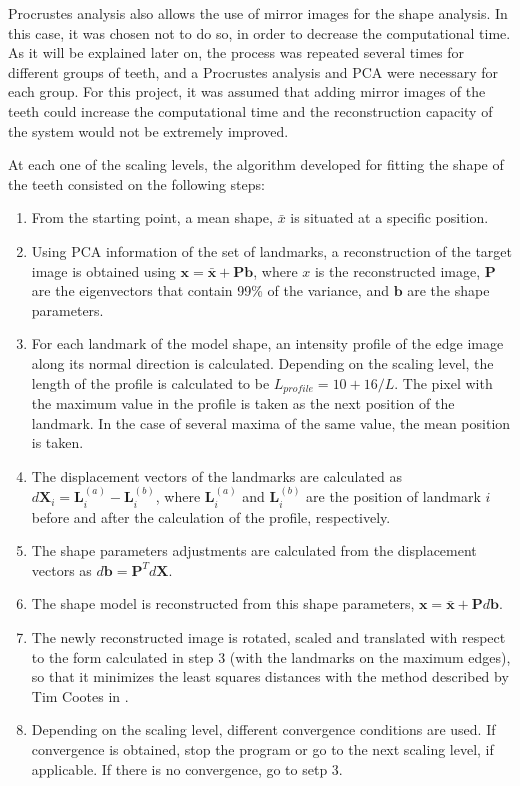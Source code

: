 \documentclass[a4paper,11pt,twoside]{article}
\begin{document}
Procrustes analysis also allows the use of mirror images for the shape analysis. In this case, it was chosen not to do so, in order to decrease the computational time. As it will be explained later on, the process was repeated several times for different groups of teeth, and a Procrustes analysis and PCA were necessary for each group. For this project, it was assumed that adding mirror images of the teeth could increase the computational time and the reconstruction capacity of the system would not be extremely improved.

At each one of the scaling levels, the algorithm developed for fitting the shape of the teeth consisted on the following steps:

\begin{enumerate}

\item From the starting point, a mean shape, $\bar{x}$ is situated at a specific position.

\item Using PCA information of the set of landmarks, a reconstruction of the target image is obtained using $\mathbf{x} = \bar{\mathbf{x}} + \mathbf{Pb}$, where $x$ is the reconstructed image, $\mathbf{P}$ are the eigenvectors that contain 99\% of the variance, and $\mathbf{b}$ are the shape parameters.

\item For each landmark of the model shape, an intensity profile of the edge image along its normal direction is calculated. Depending on the scaling level, the length of the profile is calculated to be $L_{profile} = 10 + 16/L$. The pixel with the maximum value in the profile is taken as the next position of the landmark. In the case of several maxima of the same value, the mean position is taken.

\item The displacement vectors of the landmarks are calculated as $d\mathbf{X}_i = \mathbf{L}_i^{(a)} - \mathbf{L}_i^{(b)}$, where $\mathbf{L}_i^{(a)}$ and $\mathbf{L}_i^{(b)}$ are the position of landmark $i$ before and after the calculation of the profile, respectively.

\item The shape parameters adjustments are calculated from the displacement vectors as $d\mathbf{b}=\mathbf{P}^Td\mathbf{X}$.

\item The shape model is reconstructed from this shape parameters, $\mathbf{x} = \bar{\mathbf{x}} + \mathbf{P}d\mathbf{b}$.

\item The newly reconstructed image is rotated, scaled and translated with respect to the form calculated in step 3 (with the landmarks on the maximum edges), so that it minimizes the least squares distances with the method described by Tim Cootes in \cite{ASM}.  

\item Depending on the scaling level, different convergence conditions are used. If convergence is obtained, stop the program or go to the next scaling level, if applicable. If there is no convergence, go to setp 3.

\end{enumerate}
\end{document}
